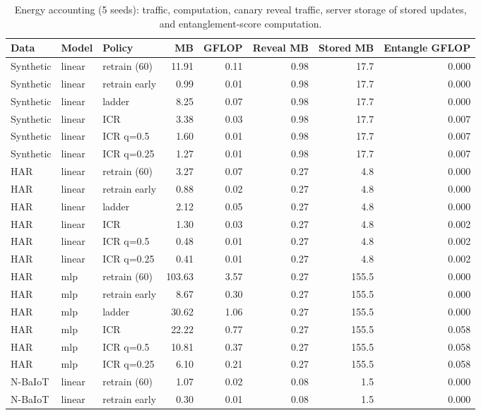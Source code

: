 \begin{table}[h]
\centering
\caption{Energy accounting (5 seeds): traffic, computation, canary reveal traffic, server storage of stored updates, and entanglement-score computation.}\label{tab:s_acct}
\footnotesize
\setlength{\tabcolsep}{3pt}
\begin{tabular}{@{}lllrrrrr@{}}
\toprule
Data & Model & Policy & MB & GFLOP & Reveal MB & Stored MB & Entangle GFLOP \\
\midrule
Synthetic & linear & retrain (60) & 11.91 & 0.11 & 0.98 & 17.7 & 0.000 \\
Synthetic & linear & retrain early & 0.99 & 0.01 & 0.98 & 17.7 & 0.000 \\
Synthetic & linear & ladder & 8.25 & 0.07 & 0.98 & 17.7 & 0.000 \\
Synthetic & linear & ICR & 3.38 & 0.03 & 0.98 & 17.7 & 0.007 \\
Synthetic & linear & ICR q=0.5 & 1.60 & 0.01 & 0.98 & 17.7 & 0.007 \\
Synthetic & linear & ICR q=0.25 & 1.27 & 0.01 & 0.98 & 17.7 & 0.007 \\
HAR & linear & retrain (60) & 3.27 & 0.07 & 0.27 & 4.8 & 0.000 \\
HAR & linear & retrain early & 0.88 & 0.02 & 0.27 & 4.8 & 0.000 \\
HAR & linear & ladder & 2.12 & 0.05 & 0.27 & 4.8 & 0.000 \\
HAR & linear & ICR & 1.30 & 0.03 & 0.27 & 4.8 & 0.002 \\
HAR & linear & ICR q=0.5 & 0.48 & 0.01 & 0.27 & 4.8 & 0.002 \\
HAR & linear & ICR q=0.25 & 0.41 & 0.01 & 0.27 & 4.8 & 0.002 \\
HAR & mlp & retrain (60) & 103.63 & 3.57 & 0.27 & 155.5 & 0.000 \\
HAR & mlp & retrain early & 8.67 & 0.30 & 0.27 & 155.5 & 0.000 \\
HAR & mlp & ladder & 30.62 & 1.06 & 0.27 & 155.5 & 0.000 \\
HAR & mlp & ICR & 22.22 & 0.77 & 0.27 & 155.5 & 0.058 \\
HAR & mlp & ICR q=0.5 & 10.81 & 0.37 & 0.27 & 155.5 & 0.058 \\
HAR & mlp & ICR q=0.25 & 6.10 & 0.21 & 0.27 & 155.5 & 0.058 \\
N-BaIoT & linear & retrain (60) & 1.07 & 0.02 & 0.08 & 1.5 & 0.000 \\
N-BaIoT & linear & retrain early & 0.30 & 0.01 & 0.08 & 1.5 & 0.000 \\

\end{tabular}
\end{table}
